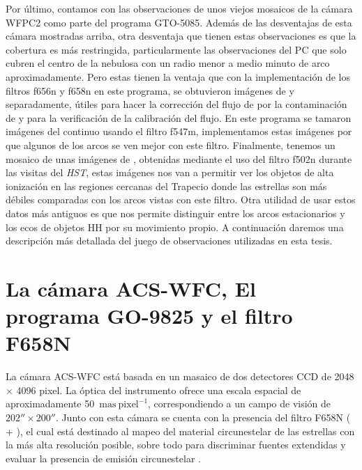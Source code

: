 Por último, contamos con  las observaciones de unos viejos mosaicos de la cámara WFPC2 como parte del programa GTO-5085. Además de las desventajas de esta cámara mostradas arriba, otra desventaja que tienen estas observaciones es que la cobertura es más restringida, particularmente las observaciones del PC que solo cubren el centro de la nebulosa con un radio menor a medio minuto de arco aproximadamente. Pero estas tienen la ventaja que con la implementación de los filtros f656n y f658n en este programa, se obtuvieron imágenes de \ha{} y \nii{} separadamente, útiles para hacer la corrección del flujo de \ha{} por la contaminación de \nii{} y para la verificación de la calibración del flujo. En este programa se tamaron imágenes del continuo usando el filtro f547m, implementamos estas imágenes por que algunos de los arcos se ven mejor con este filtro. Finalmente, tenemos un mosaico de unas imágenes de \oiii{}, obtenidas mediante el uso del filtro f502n durante las visitas del \textit{HST}, estas imágenes nos van a permitir ver los objetos de alta ionización en las regiones cercanas del Trapecio donde las estrellas son más débiles comparadas con los arcos vistas con este filtro. Otra utilidad de usar estos datos más antiguos es que nos permite distinguir entre los arcos estacionarios y los ecos de objetos HH por su movimiento propio. A continuación daremos una descripción más detallada del juego de observaciones utilizadas en esta tesis.        

\section{La cámara ACS-WFC, El programa GO-9825 y el filtro F658N }
\label{sec:acs}

La cámara ACS-WFC está basada en un masaico de dos detectores CCD de 2048 \(\times\) 4096 pixel. La óptica del instrumento ofrece una escala espacial de aproximadamente 50~\(\mathrm{mas~pixel^{-1}}\), correspondiendo a un campo de visión  de \(202'' \times 200''\). Junto con esta cámara se cuenta con la presencia del filtro F658N (\ha{} + \nii{}), el cual está destinado al mapeo del material circunestelar de las estrellas con la más alta resolución posible, sobre todo para discriminar fuentes extendidas y evaluar la presencia de emisión circunestelar \citep{Robberto:2013a}.\\

